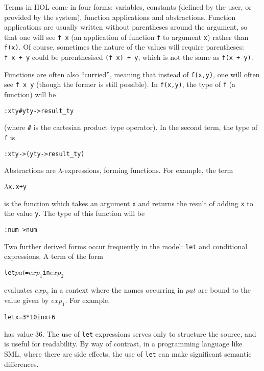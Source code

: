 \documentclass[11pt]{article}
\begin{document}
Terms in HOL come in four forms: variables, constants (defined by the
user, or provided by the system), function applications and
abstractions.  Function applications are usually written without
parentheses around the argument, so that one will see \texttt{f~x} (an
application of function \texttt{f} to argument \texttt{x}) rather than
\texttt{f(x)}.  Of course, sometimes the nature of the values will
require parentheses: \texttt{f~x~+~y} could be parenthesised
\texttt{(f~x)~+~y}, which is not the same as \texttt{f(x~+~y)}.

Functions are often also ``curried'', meaning that instead of
\texttt{f(x,y)}, one will often see \texttt{f~x~y} (though the former
is still possible).  In \texttt{f(x,y)}, the type of \texttt{f} (a
function) will be
\begin{alltt}
   :xty # yty -> result\_ty
\end{alltt}
(where \texttt{\#} is the cartesian product type operator).  In the
second term, the type of \texttt{f} is
\begin{alltt}
   :xty -> (yty -> result\_ty)
\end{alltt}

\noindent
Abstractions are $\lambda$-expressions, forming functions.  For
example, the term
\begin{alltt}
   \(\lambda\)x. x + y
\end{alltt}
is the function which takes an argument \texttt{x} and returns the
result of adding \texttt{x} to the value \texttt{y}.  The type of this
function will be
\begin{alltt}
   :num -> num
\end{alltt}

\vspace{1ex}
\noindent Two further derived forms occur frequently in the \cpp{}
model: \texttt{let} and conditional expressions.
%
%
A term of the form
\begin{alltt}
   let \(\mathit{pat}\) = \(\mathit{exp}_1\) in \(\mathit{exp}_2\)
\end{alltt}
evaluates $\mathit{exp}_2$ in a context where the names occurring in
$\mathit{pat}$ are bound to the value given by $\mathit{exp}_1$.  For
example,
\begin{alltt}
   let x = 3 * 10 in x + 6
\end{alltt}
has value 36.  The use of \texttt{let} expressions serves only to
structure the source, and is useful for readability.  By way of
contrast, in a programming language like SML, where there are side
effects, the use of \texttt{let} can make significant semantic
differences.
\end{document}
